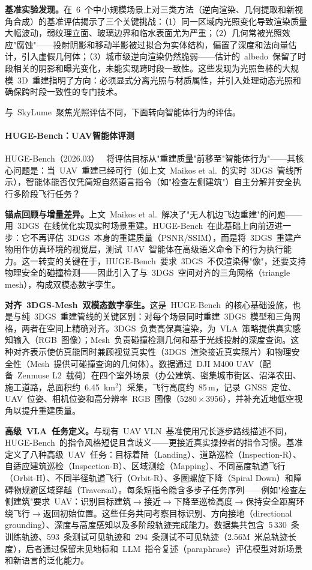 \textbf{基准实验发现。}在~6~个中小规模场景上对三类方法（逆向渲染、几何提取和新视角合成）的基准评估揭示了三个关键挑战：（1）同一区域内光照变化导致渲染质量大幅波动，弱纹理立面、玻璃边界和临水表面尤为严重；（2）几何常被光照效应"腐蚀"——投射阴影和移动半影被过拟合为实体结构，偏置了深度和法向量估计，引入虚假几何体；（3）城市级逆向渲染仍然脆弱——估计的~albedo~保留了时段相关的阴影和曝光变化，未能实现跨时段一致性。这些发现为光照鲁棒的大规模~3D~重建指明了方向：必须显式分离光照与材质属性，并引入处理动态光照和确保跨时段一致性的专门技术。

与~SkyLume~聚焦光照评估不同，下面转向智能体行为的评估。

\paragraph{HUGE-Bench：UAV智能体评测}

HUGE-Bench（2026.03）~\cite{2603_19822} 将评估目标从"重建质量"前移至"智能体行为"——其核心问题是：当~UAV~重建已经可行（如上文~Maikos et al.~的实时~3DGS~管线所示），智能体能否仅凭简短自然语言指令（如"检查左侧建筑"）自主分解并安全执行多阶段飞行任务？

\textbf{锚点回顾与增量差异。}上文~Maikos et al.~解决了"无人机边飞边重建"的问题——用~3DGS~在线优化实现实时场景重建。HUGE-Bench~在此基础上向前迈进一步：它不再评估~3DGS~本身的重建质量（PSNR/SSIM），而是将~3DGS~重建产物用作仿真环境的视觉层，测试~UAV~智能体在高级语义命令下的行为执行能力。这一转变的关键在于，HUGE-Bench~要求~3DGS~不仅渲染得"像"，还要支持物理安全的碰撞检测——因此引入了与~3DGS~空间对齐的三角网格（triangle mesh），构成双模态数字孪生。

\textbf{对齐~3DGS-Mesh~双模态数字孪生。}这是~HUGE-Bench~的核心基础设施，也是与纯~3DGS~重建管线的关键区别：对每个场景同时重建~3DGS~模型和三角网格，两者在空间上精确对齐。3DGS~负责高保真渲染，为~VLA~策略提供真实感知输入（RGB~图像）；Mesh~负责碰撞检测几何和基于光线投射的深度查询。这种对齐表示使仿真能同时兼顾视觉真实性（3DGS~渲染接近真实照片）和物理安全性（Mesh~提供可碰撞查询的几何体）。数据通过~DJI M400 UAV（配备~Zenmuse L2~载荷）在四个室外场景（办公建筑、密集城市街区、沼泽农田、施工道路，总面积约~6.45~km$^2$）采集，飞行高度约~85\,m，记录~GNSS~定位、UAV~位姿、相机位姿和高分辨率~RGB~图像（$5280\times3956$），并补充近地低空视角以提升重建质量。

\textbf{高级~VLA~任务定义。}与现有~UAV VLN~基准使用冗长逐步路线描述不同，HUGE-Bench~的指令风格短促且含歧义——更接近真实操控者的指令习惯。基准定义了八种高级~UAV~任务：目标着陆（Landing）、道路巡检（Inspection-R）、自适应建筑巡检（Inspection-B）、区域测绘（Mapping）、不同高度轨道飞行（Orbit-H）、不同半径轨道飞行（Orbit-R）、多圈螺旋下降（Spiral Down）和障碍物规避区域穿越（Traversal）。每条短指令隐含多步子任务序列——例如"检查左侧建筑"要求~UAV：识别目标建筑$\to$接近$\to$下降至巡检高度$\to$保持安全距离环绕飞行$\to$返回初始位置。这些任务共同考察目标识别、方向接地（directional grounding）、深度与高度感知以及多阶段轨迹完成能力。数据集共包含~5\,330~条训练轨迹、593~条测试可见轨迹和~294~条测试不可见轨迹（2.56M~米总轨迹长度），后者通过保留未见地标和~LLM~指令复述（paraphrase）评估模型对新场景和新语言的泛化能力。

